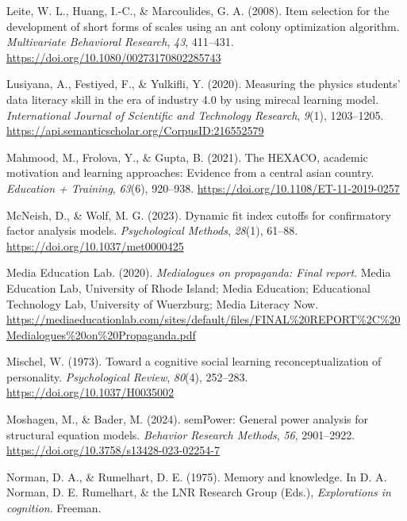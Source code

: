 \documentclass[
  12pt,
  a4paper,
  twoside]{article}
\newlength{\cslhangindent}
\newenvironment{CSLReferences}[2] %
 {\begin{list}{}{%
  \setlength{\itemindent}{0pt}
  \setlength{\leftmargin}{0pt}
  \setlength{\parsep}{0pt}
  \ifodd #1
   \setlength{\leftmargin}{\cslhangindent}
   \setlength{\itemindent}{-1\cslhangindent}
  \fi
  \setlength{\itemsep}{#2\baselineskip}}}
 {\end{list}}
\begin{document}
\begin{CSLReferences}{1}{0}
Leite, W. L., Huang, I.-C., \& Marcoulides, G. A. (2008). Item selection for the development of short forms of scales using an ant colony optimization algorithm. \emph{Multivariate Behavioral Research}, \emph{43}, 411--431. \url{https://doi.org/10.1080/00273170802285743}

Lusiyana, A., Festiyed, F., \& Yulkifli, Y. (2020). Measuring the physics students' data literacy skill in the era of industry 4.0 by using mirecal learning model. \emph{International Journal of Scientific and Technology Research}, \emph{9}(1), 1203--1205. \url{https://api.semanticscholar.org/CorpusID:216552579}

Mahmood, M., Frolova, Y., \& Gupta, B. (2021). The HEXACO, academic motivation and learning approaches: Evidence from a central asian country. \emph{Education + Training}, \emph{63}(6), 920--938. \url{https://doi.org/10.1108/ET-11-2019-0257}

McNeish, D., \& Wolf, M. G. (2023). Dynamic fit index cutoffs for confirmatory factor analysis models. \emph{Psychological Methods}, \emph{28}(1), 61--88. \url{https://doi.org/10.1037/met0000425}

Media Education Lab. (2020). \emph{Medialogues on propaganda: Final report}. Media Education Lab, University of Rhode Island; Media Education; Educational Technology Lab, University of Wuerzburg; Media Literacy Now. \url{https://mediaeducationlab.com/sites/default/files/FINAL\%20REPORT\%2C\%20Medialogues\%20on\%20Propaganda.pdf}

Mischel, W. (1973). Toward a cognitive social learning reconceptualization of personality. \emph{Psychological Review}, \emph{80}(4), 252--283. \url{https://doi.org/10.1037/H0035002}

Moshagen, M., \& Bader, M. (2024). semPower: General power analysis for structural equation models. \emph{Behavior Research Methods}, \emph{56}, 2901--2922. \url{https://doi.org/10.3758/s13428-023-02254-7}

Norman, D. A., \& Rumelhart, D. E. (1975). Memory and knowledge. In D. A. Norman, D. E. Rumelhart, \& the LNR Research Group (Eds.), \emph{Explorations in cognition}. Freeman.


\end{CSLReferences}
\end{document}
